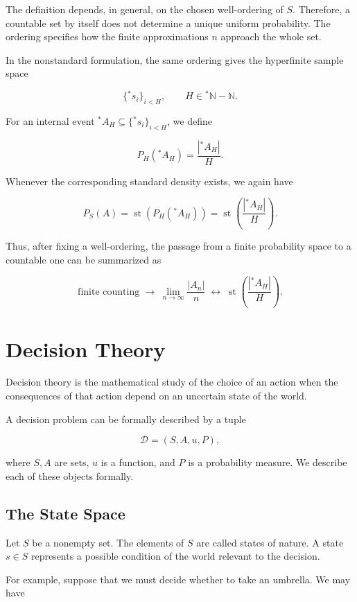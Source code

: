 \documentclass[10pt,a4paper]{book}
\begin{document}
The definition depends, in general, on the chosen well-ordering of $S$. Therefore, a countable set by itself does not determine a unique uniform probability. The ordering specifies how the finite approximations $n$ approach the whole set.


In the nonstandard formulation, the same ordering gives the hyperfinite sample space

$$
    \{{}^*s_i\}_{i<H},
    \qquad H\in{}^*\mathbb N-\mathbb N.
$$

For an internal event \({}^*A_H\subseteq\{{}^*s_i\}_{i<H}\), we define

$$
    P_H({}^*A_H)=\frac{|{}^*A_H|}{H}.
$$

Whenever the corresponding standard density exists, we again have

$$
    P_S(A)=\operatorname{st}\left(P_H({}^*A_H)\right)
    =\operatorname{st}\left(\frac{|{}^*A_H|}{H}\right).
$$

Thus, after fixing a well-ordering, the passage from a finite probability space to a countable one can be summarized as

$$
    \text{finite counting}
    \;\longrightarrow\;
    \lim_{n\to\infty}\frac{|A_n|}{n}
    \;\longleftrightarrow\;
    \operatorname{st}\left(\frac{|{}^*A_H|}{H}\right).
$$



\section{Decision Theory}

Decision theory is the mathematical study of the choice of an action when the consequences of that action depend on an uncertain state of the world.

A decision problem can be formally described by a tuple

$$
    \mathcal D=(S,A,u,P),
$$

where \(S,A\) are sets, \(u\) is a function, and \(P\) is a probability measure. We describe each of these objects formally.

\subsection{The State Space}

Let \(S\) be a nonempty set. The elements of \(S\) are called states of nature. A state \(s\in S\) represents a possible condition of the world relevant to the decision.

For example, suppose that we must decide whether to take an umbrella. We may have
\end{document}
